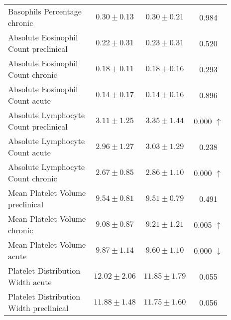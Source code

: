 \begin{table}[htbp]
\begin{tabular}{lccc}
\makecell[l]{Basophils Percentage \\ chronic} & $0.30 \pm 0.13$ & $0.30 \pm 0.21$ & 0.984  \\

\makecell[l]{Absolute Eosinophil \\ Count preclinical} & $0.22 \pm 0.31$ & $0.23 \pm 0.31$ & 0.520  \\

\makecell[l]{Absolute Eosinophil \\ Count chronic} & $0.18 \pm 0.11$ & $0.18 \pm 0.16$ & 0.293  \\

\makecell[l]{Absolute Eosinophil \\ Count acute} & $0.14 \pm 0.17$ & $0.14 \pm 0.16$ & 0.896  \\

\makecell[l]{Absolute Lymphocyte \\ Count preclinical} & $3.11 \pm 1.25$ & $3.35 \pm 1.44$ & 0.000 $\uparrow$ \\

\makecell[l]{Absolute Lymphocyte \\ Count acute} & $2.96 \pm 1.27$ & $3.03 \pm 1.29$ & 0.238  \\

\makecell[l]{Absolute Lymphocyte \\ Count chronic} & $2.67 \pm 0.85$ & $2.86 \pm 1.10$ & 0.000 $\uparrow$ \\

\makecell[l]{Mean Platelet Volume \\ preclinical} & $9.54 \pm 0.81$ & $9.51 \pm 0.79$ & 0.491  \\

\makecell[l]{Mean Platelet Volume \\ chronic} & $9.08 \pm 0.87$ & $9.21 \pm 1.21$ & 0.005 $\uparrow$ \\

\makecell[l]{Mean Platelet Volume \\ acute} & $9.87 \pm 1.14$ & $9.60 \pm 1.10$ & 0.000 $\downarrow$ \\

\makecell[l]{Platelet Distribution \\ Width acute} & $12.02 \pm 2.06$ & $11.85 \pm 1.79$ & 0.055  \\

\makecell[l]{Platelet Distribution \\ Width preclinical} & $11.88 \pm 1.48$ & $11.75 \pm 1.60$ & 0.056  \\


\end{tabular}
\end{table}
